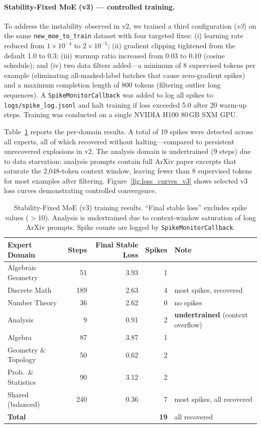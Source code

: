 \documentclass[11pt,a4paper]{article}
\begin{document}
\paragraph{Stability-Fixed MoE (v3) --- controlled training.}
To address the instability observed in v2, we trained a third configuration (\emph{v3}) on the same \texttt{new\_moe\_to\_train} dataset with four targeted fixes: (i) learning rate reduced from $1\times10^{-4}$ to $2\times10^{-5}$; (ii) gradient clipping tightened from the default 1.0 to 0.3; (iii) warmup ratio increased from 0.03 to 0.10 (cosine schedule); and (iv) two data filters added---a minimum of 8 supervised tokens per example (eliminating all-masked-label batches that cause zero-gradient spikes) and a maximum completion length of 800 tokens (filtering outlier long sequences). A \texttt{SpikeMonitorCallback} was added to log all spikes to \texttt{logs/spike\_log.jsonl} and halt training if loss exceeded 5.0 after 20 warm-up steps. Training was conducted on a single NVIDIA H100 80\,GB SXM GPU.

Table~\ref{tab:loss_curves_v3} reports the per-domain results. A total of 19 spikes were detected across all experts, all of which recovered without halting---compared to persistent unrecovered explosions in v2. The analysis domain is undertrained (9 steps) due to data starvation: analysis prompts contain full ArXiv paper excerpts that saturate the 2{,}048-token context window, leaving fewer than 8 supervised tokens for most examples after filtering. Figure~\ref{fig:loss_curves_v3} shows selected v3 loss curves demonstrating controlled convergence.

\begin{table}[t]
\centering
\caption{Stability-Fixed MoE (v3) training results. ``Final stable loss'' excludes spike values ($>$10). Analysis is undertrained due to context-window saturation of long ArXiv prompts. Spike counts are logged by \texttt{SpikeMonitorCallback}.}
\label{tab:loss_curves_v3}
\small
\begin{tabular}{@{}lrrrl@{}}
\toprule
\textbf{Expert Domain} & \textbf{Steps} & \textbf{Final Stable Loss} & \textbf{Spikes} & \textbf{Note} \\
\midrule
Algebraic Geometry  & 51  & 3.93 & 1 & \\
Discrete Math       & 189 & 2.63 & 4 & most spikes, recovered \\
Number Theory       & 36  & 2.62 & 0 & no spikes \\
Analysis            & 9   & 0.91 & 2 & \textbf{undertrained} (context overflow) \\
Algebra             & 87  & 3.87 & 1 & \\
Geometry \& Topology & 50 & 0.62 & 2 & \\
Prob.\ \& Statistics & 90 & 3.12 & 2 & \\
Shared (balanced)   & 240 & 0.36 & 7 & most spikes, all recovered \\
\midrule
\textbf{Total}      &     &      & \textbf{19} & all recovered \\
\bottomrule
\end{tabular}
\end{table}
\end{document}

